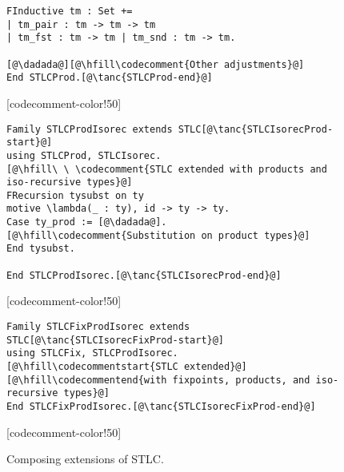 \begin{figure}
\begin{minipage}{\textwidth}
\begin{multicols}{2}
\begin{lstlisting}
FInductive tm : Set +=
| tm_pair : tm -> tm -> tm
| tm_fst : tm -> tm | tm_snd : tm -> tm.

[@\dadada@][@\hfill\codecomment{Other adjustments}@]
End STLCProd.[@\tanc{STLCProd-end}@]
\end{lstlisting}

[codecomment-color!50]

\vspace{-10pt}


\begin{lstlisting}
Family STLCProdIsorec extends STLC[@\tanc{STLCIsorecProd-start}@]
using STLCProd, STLCIsorec.
[@\hfill\ \ \codecomment{STLC extended with products and iso-recursive types}@]
FRecursion tysubst on ty
motive \lambda(_ : ty), id -> ty -> ty.
Case ty_prod := [@\dadada@].[@\hfill\codecomment{Substitution on product types}@]
End tysubst.

End STLCProdIsorec.[@\tanc{STLCIsorecProd-end}@]
\end{lstlisting}

[codecomment-color!50]

\vspace{-10pt}


\begin{lstlisting}
Family STLCFixProdIsorec extends STLC[@\tanc{STLCIsorecFixProd-start}@]
using STLCFix, STLCProdIsorec.[@\hfill\codecommentstart{STLC extended}@]
[@\hfill\codecommentend{with fixpoints, products, and iso-recursive types}@]
End STLCFixProdIsorec.[@\tanc{STLCIsorecFixProd-end}@]
\end{lstlisting}

[codecomment-color!50]

\end{multicols}
\end{minipage}

\vspace{-10pt}

\caption{Composing extensions of STLC.}
\label{fig:stlc-isorec-prod}
\end{figure}